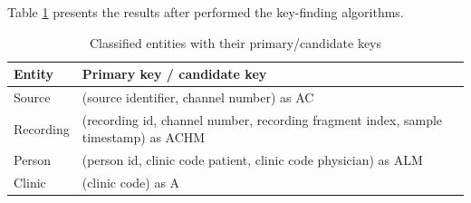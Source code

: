 Table \ref{tab:entitiesPrimaryKey} presents the results after performed the key-finding algorithms.\\
\begin{table}[ht]
\begin{center}
\begin{tabular}{ |p{3cm}||p{10cm}|}
 \hline
 Entity& Primary key / candidate key\\
 \hline
 Source& (source identifier, channel number) as AC\\
 \hline
 Recording& (recording id, channel number, recording fragment index, sample timestamp) as ACHM\\
 \hline
 Person& (person id, clinic code patient, clinic code physician) as ALM\\
 \hline
 Clinic& (clinic code) as A\\
 \hline
\end{tabular}
\end{center}
\caption{Classified entities with their primary/candidate keys}
\label{tab:entitiesPrimaryKey}
\end{table}
